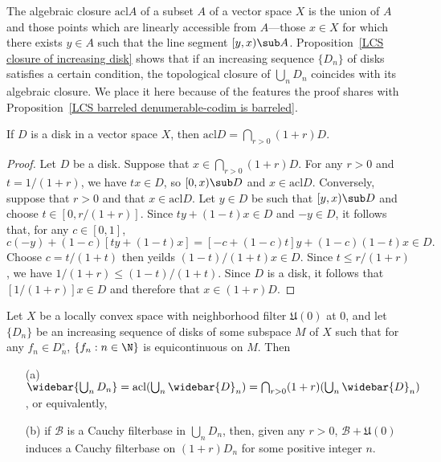 The algebraic closure $\mathrm{acl}A$ of a subset $A$ of a vector space $X$ is the union of $A$ and those points which are linearly accessible from $A$---those $x\in X$ for which there exists $y\in A$ such that the line segment $[y,x)\sub A$. Proposition~\ref{LCS closure of increasing disk} shows that if an increasing sequence $\{D_n\}$ of disks satisfies a certain condition, the topological closure of $\bigcup_nD_n$ coincides with its algebraic closure. We place it here because of the features the proof shares with Proposition~\ref{LCS barreled denumerable-codim is barreled}.
\begin{proposition}\label{TVS algebraic closure char}
If $D$ is a disk in a vector space $X$, then $\mathrm{acl}D=\bigcap_{r>0}(1+r)D$.
\end{proposition}
\begin{proof}
Let $D$ be a disk. Suppose that $x\in\bigcap_{r>0}(1+r)D$. For any $r>0$ and $t=1/(1+r)$, we have $tx\in D$, so $[0,x)\sub D$ and $x\in\mathrm{acl}D$. Conversely, suppose that $r>0$ and that $x\in\mathrm{acl}D$. Let $y\in D$ be such that $[y,x)\sub D$ and choose $t\in[0,r/(1+r)]$. Since $ty+(1-t)x\in D$ and $-y\in D$, it follows that, for any $c\in[0,1]$,
\[c(-y)+(1-c)[ty+(1-t)x]=[-c+(1-c)t]y+(1-c)(1-t)x\in D.\]
Choose $c=t/(1+t)$ then yeilds $(1-t)/(1+t)x\in D$. Since $t\leq r/(1+r)$, we have $1/(1+r)\leq(1-t)/(1+t)$. Since $D$ is a disk, it follows that $[1/(1+r)] x\in D$ and therefore that $x\in (1+r)D$.
\end{proof}
\begin{proposition}\label{LCS closure of increasing disk}
Let $X$ be a locally convex space with neighborhood filter $\mathfrak{U}(0)$ at $0$, and let $\{D_n\}$ be an increasing sequence of disks of some subspace $M$ of $X$ such that for any $f_n\in D_n^\circ$, $\{f_n:n\in\N\}$ is equicontinuous on $M$. Then
\begin{itemize}
\item[(a)] $\widebar{\bigcup_nD_n}=\mathrm{acl}(\bigcup_n\widebar{D}_n)=\bigcap_{r>0}(1+r)(\bigcup_n\widebar{D}_n)$, or equivalently,
\item[(b)] if $\mathcal{B}$ is a Cauchy filterbase in $\bigcup_nD_n$, then, given any $r>0$, $\mathcal{B}+\mathfrak{U}(0)$ induces a Cauchy filterbase on $(1+r)D_n$ for some positive integer $n$.
\end{itemize}
\end{proposition}
